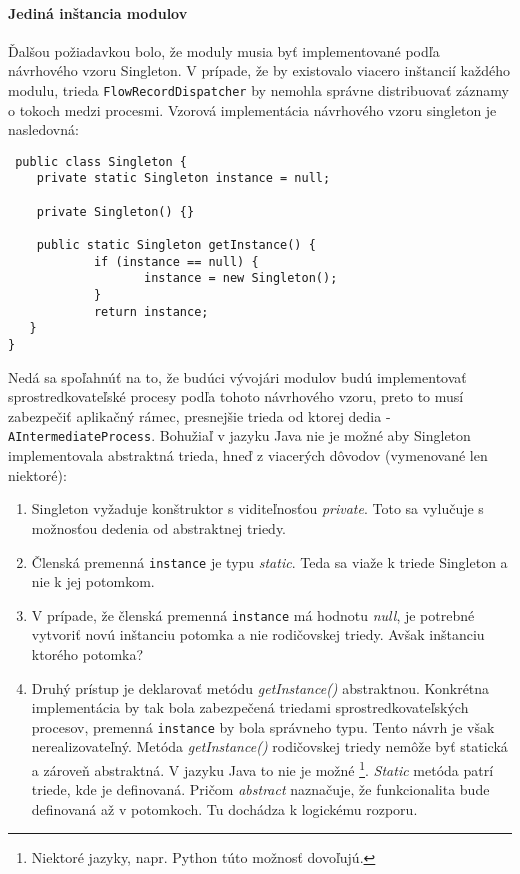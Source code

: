 \paragraph{Jediná inštancia modulov} \label{sec:singleton}
Ďalšou požiadavkou bolo, že moduly musia byť implementované podľa návrhového vzoru Singleton. V prípade, že
by existovalo viacero inštancií každého modulu, trieda \verb|FlowRecordDispatcher| by nemohla správne 
distribuovať záznamy o tokoch medzi procesmi. Vzorová implementácia návrhového
vzoru singleton je nasledovná:  
\begin{verbatim}
 public class Singleton {
    private static Singleton instance = null;
 
    private Singleton() {}
 
    public static Singleton getInstance() {
            if (instance == null) {
                   instance = new Singleton();
            }
            return instance;
   }
}
\end{verbatim}
Nedá sa spoľahnúť na to, že budúci vývojári modulov budú implementovať sprostredkovateľské procesy 
podľa tohoto návrhového vzoru, preto to musí zabezpečiť aplikačný rámec, presnejšie trieda od ktorej 
dedia - \verb|AIntermediateProcess|.
Bohužiaľ v jazyku Java nie je možné aby Singleton implementovala abstraktná trieda, hneď z viacerých
dôvodov (vymenované len niektoré):
\begin{enumerate}
 \item Singleton vyžaduje konštruktor s viditeľnosťou \emph{private}. Toto sa vylučuje s možnosťou 
 dedenia od abstraktnej triedy.
 \item Členská premenná \verb|instance| je typu \emph{static}. Teda sa viaže k triede Singleton a nie k jej 
 potomkom.
 \item V prípade, že členská premenná \verb|instance| má hodnotu \emph{null}, je potrebné vytvoriť novú inštanciu 
 potomka a nie rodičovskej triedy. Avšak inštanciu ktorého potomka?
 \item Druhý prístup je deklarovať metódu \emph{getInstance()} abstraktnou. Konkrétna implementácia 
 by tak bola zabezpečená triedami sprostredkovateľských procesov, premenná \verb|instance|
 by bola správneho typu. Tento návrh je však nerealizovateľný. 
 Metóda \emph{getInstance()} rodičovskej triedy nemôže byť statická a zároveň abstraktná. V jazyku Java
 to nie je možné \footnote{Niektoré jazyky, napr. Python túto možnosť dovoľujú.}. 
 \emph{Static} metóda patrí triede, kde je definovaná. 
 Pričom \emph{abstract} naznačuje, že funkcionalita bude definovaná až v potomkoch. Tu dochádza k 
 logickému rozporu.
\end{enumerate}
